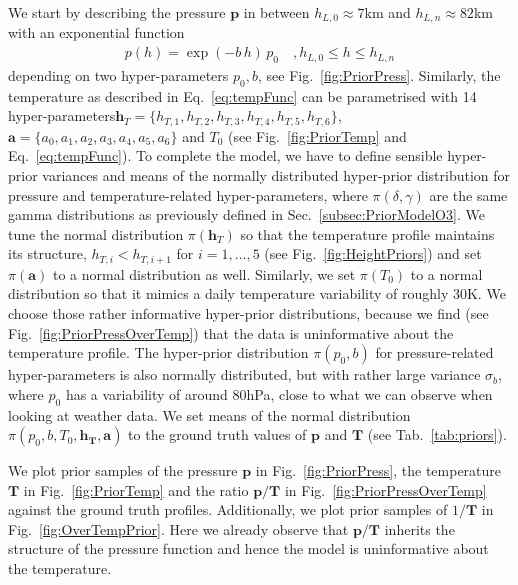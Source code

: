 We start by describing the pressure $\bm{p}$ in between $h_{L,0} \approx 7$km and $h_{L,n} \approx 82$km with an exponential function
\begin{align}
	p(h) =
	\exp \left( -b \, h \right)   \,  p_0 \quad , \text{$h_{L,0}  \leq h \leq h_{L,n}$}
	\label{eq:pressFunc}
\end{align}
depending on two hyper-parameters $p_0,b$, see Fig.~\ref{fig:PriorPress}.
Similarly, the temperature as described in Eq.~\ref{eq:tempFunc} can be parametrised with 14 hyper-parameters\linebreak $\bm{h}_T = \{ h_{T,1}, h_{T,2},h_{T,3},h_{T,4},h_{T,5},h_{T,6} \}$, $\bm{a} = \{a_0, a_1, a_2,a_3,a_4,a_5,a_6 \} $ and $T_0$ (see Fig.~\ref{fig:PriorTemp} and Eq.~\ref{eq:tempFunc}).
To complete the model, we have to define sensible hyper-prior variances and means of the normally distributed hyper-prior distribution for pressure and temperature-related hyper-parameters, where $\pi(\delta,\gamma)$ are the same gamma distributions as previously defined in Sec.~\ref{subsec:PriorModelO3}.
We tune the normal distribution $\pi(\bm{h}_T)$ so that the temperature profile maintains its structure, $ h_{T, i} < h_{T, i+1}$ for $i = 1,\dots, 5$ (see Fig.~\ref{fig:HeightPriors}) and set $\pi(\bm{a})$ to a normal distribution as well.
Similarly, we set $\pi(T_0)$ to a normal distribution so that it mimics a daily temperature variability of roughly 30K.
We choose those rather informative hyper-prior distributions, because we find (see Fig.~\ref{fig:PriorPressOverTemp}) that the data is uninformative about the temperature profile.
The hyper-prior distribution $\pi(p_0, b)$ for pressure-related hyper-parameters is also normally distributed, but with rather large variance $\sigma_b$, where $p_0$ has a variability of around 80hPa, close to what we can observe when looking at weather data.
We set means of the normal distribution $\pi(p_0,b,T_0,\bm{h_T},\bm{a})$ to the ground truth values of $\bm{p}$ and $\bm{T}$ (see Tab.~\ref{tab:priors}).

We plot prior samples of the pressure $\bm{p}$ in Fig.~\ref{fig:PriorPress}, the temperature $\bm{T}$ in Fig.~\ref{fig:PriorTemp} and the ratio $\bm{p}/\bm{T}$ in Fig.~\ref{fig:PriorPressOverTemp} against the ground truth profiles.
Additionally, we plot prior samples of $1/\bm{T}$ in Fig.~\ref{fig:OverTempPrior}.
Here we already observe that $\bm{p}/\bm{T}$ inherits the structure of the pressure function and hence the model is uninformative about the temperature.
\clearpage


